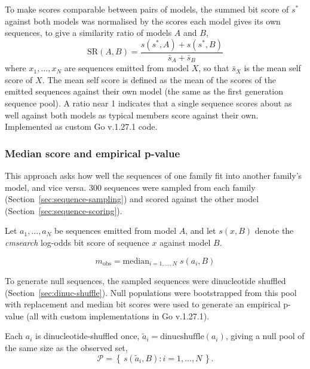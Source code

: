 To make scores comparable between pairs of models, the summed bit score of $s^{*}$ against both models was normalised by the scores each model gives its own sequences, to give a similarity ratio of models $A$ and $B$,
\begin{equation}
  \label{eq:similarity-ratio}
  \mathrm{SR}(A, B) = \frac{s(s^{*}, A) + s(s^{*}, B)}{\bar{s}_{A} + \bar{s}_{B}}
\end{equation}
where $x_1,\dots,x_N$ are sequences emitted from model $X$, so that $\bar{s}_{X}$ is the mean self score of $X$.
The mean self score is defined as the mean of the scores of the emitted sequences against their own model (the same as the first generation sequence pool).
A ratio near 1 indicates that a single sequence scores about as well against both models as typical members score against their own.
Implemented as custom Go v.1.27.1 code.

\subsubsection{Median score and empirical p-value}
\label{subsubsec:median-score}

This approach asks how well the sequences of one family fit into another family's model, and vice versa.
300 sequences were sampled from each family (Section~\ref{sec:sequence-sampling}) and scored against the other model (Section~\ref{sec:sequence-scoring}).

Let $a_1,\dots,a_N$ be sequences emitted from model $A$, and let $s(x, B)$ denote the \emph{cmsearch} log-odds bit score of sequence $x$ against model $B$.

\begin{equation}
  \label{eq:m-obs}
  m_{\mathrm{obs}} = \mathrm{median}_{i=1,\dots,N}\; s(a_i, B)
\end{equation}

To generate null sequences, the sampled sequences were dinucleotide shuffled (Section~\ref{sec:dinuc-shuffle}).
Null populations were bootstrapped from this pool with replacement and median bit scores were used to generate an empirical p-value (all with custom implementations in Go v.1.27.1).

Each $a_i$ is dinucleotide-shuffled once, $\tilde{a}_i = \mathrm{dinucshuffle}(a_i)$, giving a null pool of the same size as the observed set,
\begin{equation}
  \label{eq:null-pool}
  \mathcal{P} = \left\{\, s(\tilde{a}_i, B) : i = 1,\dots,N \,\right\}.
\end{equation}

